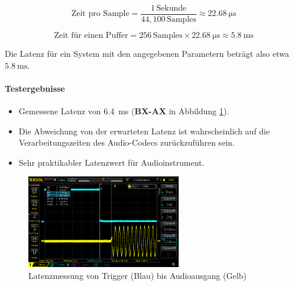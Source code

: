 	\[
	\text{Zeit pro Sample} = \frac{1 \, \text{Sekunde}}{44{,}100 \, \text{Samples}} \approx \SI{22.68}{\micro\second}
	\]
	
	\[
	\text{Zeit für einen Puffer} = 256 \, \text{Samples} \times \SI{22.68}{\micro\second} \approx \SI{5.8}{\milli\second}
	\]
	
	Die Latenz für ein System mit den angegebenen Parametern beträgt also etwa \( \SI{5.8}{\milli\second} \).
\paragraph{Testergebnisse}

\begin{itemize}
	\item Gemessene Latenz von \SI{6.4}{\milli\second} (\textbf{BX-AX} in Abbildung  \ref{fig:audio-latency-test}).
	\item Die Abweichung von der erwarteten Latenz ist wahrscheinlich auf die Verarbeitungszeiten des Audio-Codecs zurückzuführen sein.
	\item Sehr praktikabler Latenzwert für Audioinstrument.
\end{itemize}

\begin{figure}[H]
	\centering
	\includegraphics[width=0.6\textwidth]{images/10_test_validierung/audio/audio-latency-test.png}
	\caption{Latenzmessung von Trigger (Blau) bis Audioausgang (Gelb)}
	\label{fig:audio-latency-test}
\end{figure}